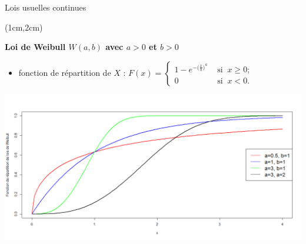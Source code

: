 \documentclass{beamer}
\begin{document}
\begin{frame}{Lois usuelles continues}
\begin{textblock*}{\textwidth}(1cm,2cm)

\begin{center}{\bf \Large Loi de Weibull $W(a,b)$ avec $a>0$ et $b>0$} \end{center}
\begin{itemize}

\item \small fonction de répartition de $X$ :
$
F(x)=
\begin{cases}
1- e^{ - \big( \frac{x}{b} \big)^{a} }& \mbox { si } \  x\geq 0;\\
0 & \mbox { si } \  x<0.
\end{cases}
$
\end{itemize}
\begin{center}
\includegraphics[scale=0.22]{images/Fdr_weibull.png}
\end{center}

\end{textblock*}

\end{frame} 

\end{document}
